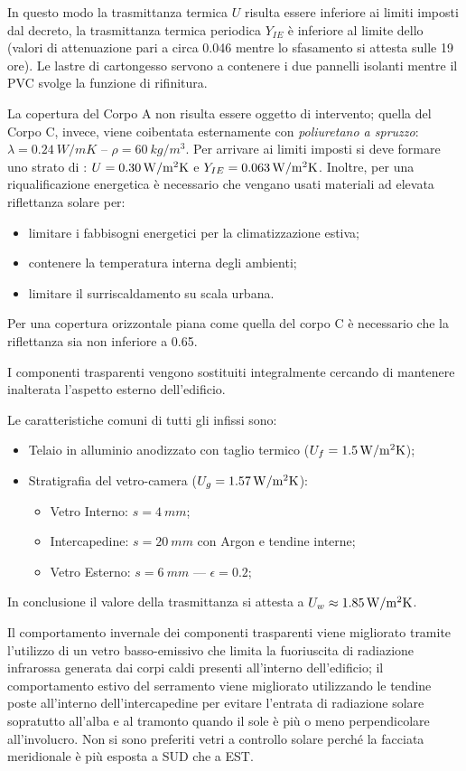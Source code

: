 In questo modo la trasmittanza termica $U$ risulta essere inferiore ai limiti imposti dal decreto, la trasmittanza termica periodica $Y_{IE}$ è inferiore al limite dello  (valori di attenuazione pari a circa \num{0.046} mentre lo sfasamento si attesta sulle \num{19} ore). Le lastre di cartongesso servono a contenere i due pannelli isolanti mentre il PVC svolge la funzione di rifinitura.

La copertura del Corpo A non risulta essere oggetto di intervento; quella del Corpo C, invece, viene coibentata esternamente con \emph{poliuretano a spruzzo}: $\lambda=\SI{0.24}{W/mK}$ -- $\rho=\SI{60}{kg/m^3}$. Per arrivare ai limiti imposti si deve formare uno strato di : $U=\SI{0.30}{\trasm}$ e $Y_{IE}=\SI{0.063}{\trasm}$. Inoltre, per una riqualificazione energetica è necessario che vengano usati materiali ad elevata riflettanza solare per:
\begin{itemize}
	\item limitare i fabbisogni energetici per la climatizzazione estiva;
	\item contenere la temperatura interna degli ambienti;
	\item limitare il surriscaldamento su scala urbana.
\end{itemize}
Per una copertura orizzontale piana come quella del corpo C è necessario che la riflettanza sia non inferiore a \num{0.65}.

I componenti trasparenti vengono sostituiti integralmente cercando di mantenere inalterata l'aspetto esterno dell'edificio. 

Le caratteristiche comuni di tutti gli infissi sono:
\begin{itemize}
	\item Telaio in alluminio anodizzato con taglio termico ($U_f=\SI{1.5}{\trasm}$);
	\item Stratigrafia del vetro-camera ($U_g=\SI{1.57}{\trasm}$):
		\begin{itemize}
			\item Vetro Interno: $s=\SI{4}{mm}$;
			\item Intercapedine: $s=\SI{20}{mm}$ con Argon e tendine interne;
			\item Vetro Esterno: $s=\SI{6}{mm}$ --- $\epsilon=0.2$;
		\end{itemize}
\end{itemize}
In conclusione il valore della trasmittanza si attesta a $U_w \approx \SI{1.85}{\trasm}$.

Il comportamento invernale dei componenti trasparenti viene migliorato tramite l'utilizzo di un vetro basso-emissivo che limita la fuoriuscita di radiazione infrarossa generata dai corpi caldi presenti all'interno dell'edificio; il comportamento estivo del serramento viene migliorato utilizzando le tendine poste all'interno dell'intercapedine per evitare l'entrata di radiazione solare sopratutto all'alba e al tramonto quando il sole è più o meno perpendicolare all'involucro. Non si sono preferiti vetri a controllo solare perché la facciata meridionale è più esposta a SUD che a EST.

